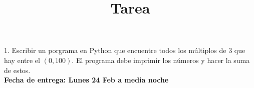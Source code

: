 \documentclass[12pt]{article}
\title{Tarea}
\begin{document}
\maketitle

1. Escribir un porgrama en Python que encuentre todos los m\'ultiplos de 3 que hay entre el $(0, 100)$. El programa 
debe imprimir los n\'umeros y hacer la suma de estos. \\

\textbf{Fecha de entrega: Lunes 24 Feb a media noche}
\end{document}
